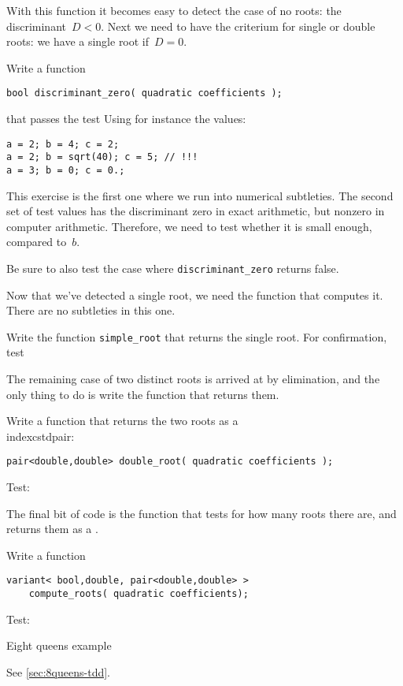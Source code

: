 With this function it becomes easy to detect the case of no roots:
the discriminant~$D<0$.
Next we need to have the criterium for single or double roots:
we have a single root if~$D=0$.

\begin{exercise}
  \label{ex:qdisczero}
  Write a function
\begin{lstlisting}
bool discriminant_zero( quadratic coefficients );
\end{lstlisting}
that passes the test
Using for instance the values:
\begin{lstlisting}
a = 2; b = 4; c = 2;
a = 2; b = sqrt(40); c = 5; // !!!
a = 3; b = 0; c = 0.;
\end{lstlisting}
\end{exercise}

This exercise is the first one where we run into
numerical subtleties.
The second set of test values has the discriminant zero
in exact arithmetic, but nonzero in computer arithmetic.
Therefore, we need to test whether it is small enough, compared to~$b$.

\begin{exercise}
  Be sure to also test the case where \lstinline+discriminant_zero+
  returns false.
\end{exercise}

Now that we've detected a single root, we need the function
that computes it. There are no subtleties in this one.

\begin{exercise}
  \label{ex:qtestsimple}
  Write the function \lstinline+simple_root+ that returns
  the single root.
  For confirmation, test
\end{exercise}

The remaining case of two distinct roots is arrived at
by elimination, and the only thing to do is write
the function that returns them.

\begin{exercise}
  \label{ex:qtestdouble}
  Write a function that returns the two roots
  as a \\indexcstd{pair}:
\begin{lstlisting}
pair<double,double> double_root( quadratic coefficients );
\end{lstlisting}
Test:
\end{exercise}

The final bit of code is the function that
tests for how many roots there are, and returns them
as a .

\begin{exercise}
  \label{ex:qtestfull}
  Write a function
\begin{lstlisting}
variant< bool,double, pair<double,double> > 
    compute_roots( quadratic coefficients);
\end{lstlisting}
Test:
\begin{multicols}{2}
\end{multicols}
\end{exercise}

 {Eight queens example}

See \ref{sec:8queens-tdd}.

